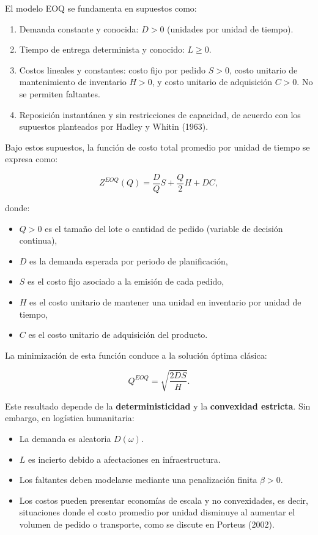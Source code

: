 \documentclass[
  spanish,
  us-letterpaper,
]{scrreprt}
\providecommand{\tightlist}{%
  \setlength{\itemsep}{0pt}\setlength{\parskip}{0pt}}
\numberwithin{equation}{section}
\begin{document}
El modelo EOQ se fundamenta en supuestos como:

\begin{enumerate}
\def\labelenumi{\arabic{enumi}.}
\tightlist
\item
  Demanda constante y conocida: \(D > 0\) (unidades por unidad de
  tiempo).
\item
  Tiempo de entrega determinista y conocido: \(L \geq 0\).
\item
  Costos lineales y constantes: costo fijo por pedido \(S > 0\), costo
  unitario de mantenimiento de inventario \(H > 0\), y costo unitario de
  adquisición \(C > 0\). No se permiten faltantes.
\item
  Reposición instantánea y sin restricciones de capacidad, de acuerdo
  con los supuestos planteados por Hadley y Whitin (1963).
\end{enumerate}

Bajo estos supuestos, la función de costo total promedio por unidad de
tiempo se expresa como:

\[
Z^{EOQ}(Q)=\frac{D}{Q}S+\frac{Q}{2}H+DC,
\]

donde:

\begin{itemize}
\tightlist
\item
  \(Q > 0\) es el tamaño del lote o cantidad de pedido (variable de
  decisión continua),
\item
  \(D\) es la demanda esperada por periodo de planificación,
\item
  \(S\) es el costo fijo asociado a la emisión de cada pedido,
\item
  \(H\) es el costo unitario de mantener una unidad en inventario por
  unidad de tiempo,
\item
  \(C\) es el costo unitario de adquisición del producto.
\end{itemize}

La minimización de esta función conduce a la solución óptima clásica:

\[
Q^{EOQ}=\sqrt{\frac{2DS}{H}}.
\]

Este resultado depende de la \textbf{deterministicidad} y la
\textbf{convexidad estricta}. Sin embargo, en logística humanitaria:

\begin{itemize}
\tightlist
\item
  La demanda es aleatoria \(D(\omega)\).
\item
  \(L\) es incierto debido a afectaciones en infraestructura.
\item
  Los faltantes deben modelarse mediante una penalización finita
  \(\beta>0\).
\item
  Los costos pueden presentar economías de escala y no convexidades, es
  decir, situaciones donde el costo promedio por unidad disminuye al
  aumentar el volumen de pedido o transporte, como se discute en Porteus
  (2002).
\end{itemize}
\end{document}
